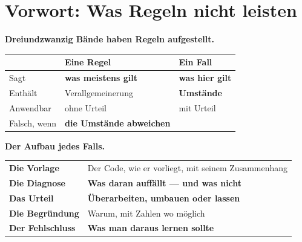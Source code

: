 \chapter*{Vorwort: Was Regeln nicht leisten}

\textbf{Dreiundzwanzig Bände haben Regeln aufgestellt.} 

\begin{merksatz}
\begin{center}
\renewcommand{\arraystretch}{1.5}
\begin{tabular}{@{}P{2.8cm}P{2.4cm}P{2.8cm}@{}}
\toprule
& \textbf{Eine Regel} & \textbf{Ein Fall}\\
\midrule
Sagt & \textbf{was meistens gilt} & \textbf{was hier gilt}\\
Enthält & Verallge\-meinerung & \textcolor{gruen}{\textbf{Umstände}}\\
Anwendbar & \textcolor{akzent}{ohne Urteil} & \textcolor{gruen}{mit Urteil}\\
Falsch, wenn & \textcolor{akzent}{\textbf{die Umstände abweichen}} & \\
\bottomrule
\end{tabular}
\end{center}

\begin{center}
\begin{minipage}{0.88\textwidth}
\end{minipage}
\end{center}

\textbf{Der Aufbau jedes Falls.}

\begin{center}
\renewcommand{\arraystretch}{1.5}
\begin{tabular}{@{}P{2.6cm}P{6.2cm}@{}}
\toprule
\textbf{Die Vorlage} & Der Code, wie er vorliegt, mit seinem Zusammenhang\\
\textbf{Die Diagnose} & \textbf{Was daran auffällt --- und was nicht}\\
\textbf{Das Urteil} & \textbf{Überarbeiten, umbauen oder lassen}\\
\textbf{Die Begründung} & Warum, mit Zahlen wo möglich\\
\textbf{Der Fehlschluss} & \textbf{Was man daraus  lernen sollte}\\
\bottomrule
\end{tabular}
\end{center}


\end{merksatz}

